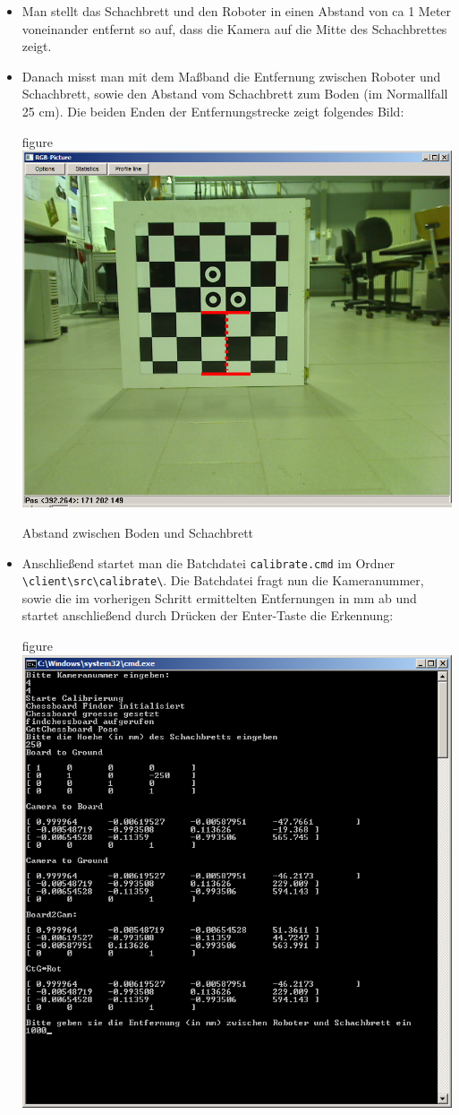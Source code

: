 \begin{itemize}
\item Man stellt das Schachbrett und den Roboter in einen Abstand von
  ca 1 Meter voneinander entfernt so auf, dass die Kamera auf die
  Mitte des Schachbrettes zeigt. 
\item Danach misst man mit dem Maßband die Entfernung zwischen Roboter
  und Schachbrett, sowie den Abstand vom Schachbrett zum Boden (im
  Normallfall 25 cm). Die
  beiden Enden der Entfernungstrecke zeigt folgendes Bild:
 \begin{nofloat}{figure}\centering
    \includegraphics[width=0.55\linewidth]{bilder/camToGround_red}
    \caption{Abstand zwischen Boden und Schachbrett}
  \end{nofloat}
\item Anschließend startet man die Batchdatei \verb|calibrate.cmd| im
  Ordner \verb|\client\src\calibrate\|. Die Batchdatei fragt nun die
  Kameranummer, sowie die im vorherigen Schritt ermittelten 
 Entfernungen in mm ab und startet anschließend durch Drücken der
 Enter-Taste die Erkennung:
 \begin{nofloat}{figure}\centering
    \includegraphics[width=1\linewidth]{bilder/calibrate1}

\end{nofloat}
\end{itemize}
